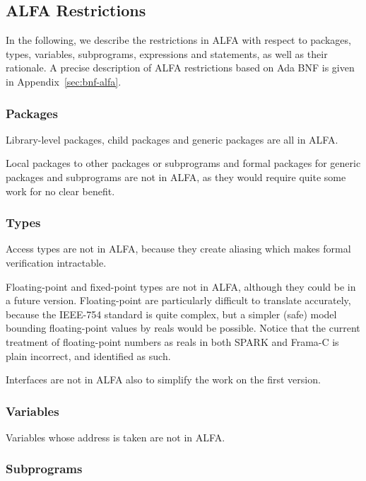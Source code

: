 \documentclass{article}
\begin{document}
\subsection{ALFA Restrictions}

In the following, we describe the restrictions in ALFA with respect to
packages, types, variables, subprograms, expressions and statements, as well as
their rationale. A precise description of ALFA restrictions based on Ada BNF is
given in Appendix~\ref{sec:bnf-alfa}.

\subsubsection{Packages}

Library-level packages, child packages and generic packages are all in ALFA.

Local packages to other packages or subprograms and formal packages for generic
packages and subprograms are not in ALFA, as they would require quite some work
for no clear benefit.

\subsubsection{Types}

Access types are not in ALFA, because they create aliasing which makes formal
verification intractable.

Floating-point and fixed-point types are not in ALFA, although they could be in
a future version. Floating-point are particularly difficult to translate
accurately, because the IEEE-754 standard is quite complex, but a simpler
(safe) model bounding floating-point values by reals would be possible. Notice
that the current treatment of floating-point numbers as reals in both SPARK and
Frama-C is plain incorrect, and identified as such.

Interfaces are not in ALFA also to simplify the work on the first version.

\subsubsection{Variables}

Variables whose address is taken are not in ALFA.

\subsubsection{Subprograms}
\end{document}
